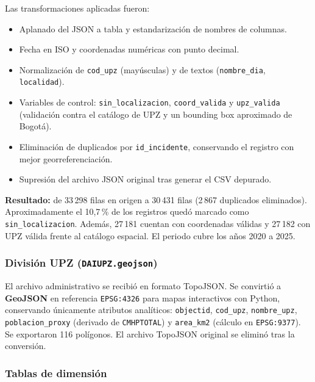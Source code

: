 \documentclass[12pt,letterpaper]{article}
\begin{document}
Las transformaciones aplicadas fueron:
\begin{itemize}[noitemsep, topsep=0pt]
    \item Aplanado del JSON a tabla y estandarización de nombres de columnas.
    \item Fecha en ISO y coordenadas numéricas con punto decimal.
    \item Normalización de \texttt{cod\_upz} (mayúsculas) y de textos (\texttt{nombre\_dia}, \texttt{localidad}).
    \item Variables de control: \texttt{sin\_localizacion}, \texttt{coord\_valida} y \texttt{upz\_valida} (validación contra el catálogo de UPZ y un bounding box aproximado de Bogotá).
    \item Eliminación de duplicados por \texttt{id\_incidente}, conservando el registro con mejor georreferenciación.
    \item Supresión del archivo JSON original tras generar el CSV depurado.
\end{itemize}

\textbf{Resultado:} de 33\,298 filas en origen a 30\,431 filas (2\,867 duplicados eliminados). Aproximadamente el 10,7\,\% de los registros quedó marcado como \texttt{sin\_localizacion}. Además, 27\,181 cuentan con coordenadas válidas y 27\,182 con UPZ válida frente al catálogo espacial. El periodo cubre los años 2020 a 2025.

\subsubsection{División UPZ (\texttt{DAIUPZ.geojson})}

El archivo administrativo se recibió en formato TopoJSON. Se convirtió a \textbf{GeoJSON} en referencia \texttt{EPSG:4326} para mapas interactivos con Python, conservando únicamente atributos analíticos: \texttt{objectid}, \texttt{cod\_upz}, \texttt{nombre\_upz}, \texttt{poblacion\_proxy} (derivado de \texttt{CMHPTOTAL}) y \texttt{area\_km2} (cálculo en \texttt{EPSG:9377}). Se exportaron 116 polígonos. El archivo TopoJSON original se eliminó tras la conversión.

\subsubsection{Tablas de dimensión}
\end{document}
